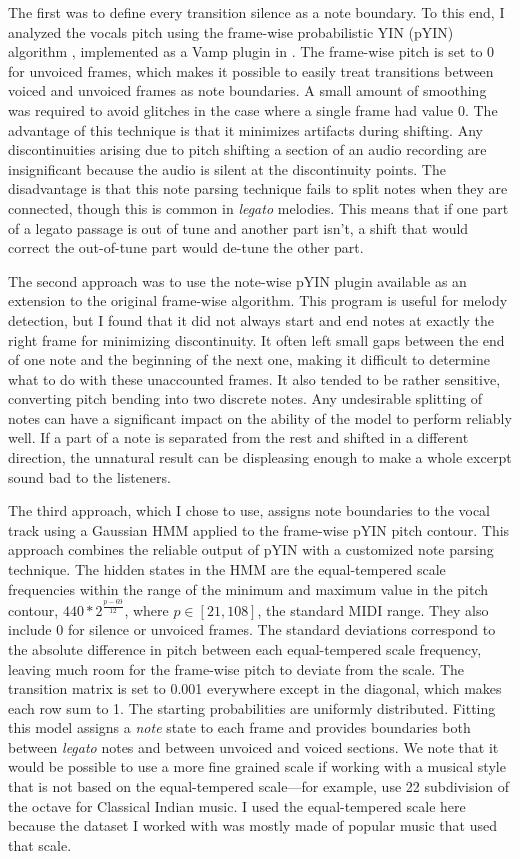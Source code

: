 The first was to define every transition silence as a note boundary. To this end, I analyzed the vocals pitch using the frame-wise probabilistic YIN (pYIN) algorithm \cite{mauch2014pyin}, implemented as a Vamp plugin in \cite{cannam2010sonic}. The frame-wise pitch is set to 0 for unvoiced frames, which makes it possible to easily treat transitions between voiced and unvoiced frames as note boundaries. A small amount of smoothing was required to avoid glitches in the case where a single frame had value 0. The advantage of this technique is that it minimizes artifacts during shifting. Any discontinuities arising due to pitch shifting a section of an audio recording are insignificant because the audio is silent at the discontinuity points. The disadvantage is that this note parsing technique fails to split notes when they are connected, though this is common in \textit{legato} melodies. This means that if one part of a legato passage is out of tune and another part isn't, a shift that would correct the out-of-tune part would de-tune the other part.

The second approach was to use the note-wise pYIN plugin available as an extension to the original frame-wise algorithm. This program is useful for melody detection, but I found that it did not always start and end notes at exactly the right frame for minimizing discontinuity. It often left small gaps between the end of one note and the beginning of the next one, making it difficult to determine what to do with these unaccounted frames. It also tended to be rather sensitive, converting pitch bending into two discrete notes. Any undesirable splitting of notes can have a significant impact on the ability of the model to perform reliably well. If a part of a note is separated from the rest and shifted in a different direction, the unnatural result can be displeasing enough to make a whole excerpt sound bad to the listeners.

The third approach, which I chose to use, assigns note boundaries to the vocal track using a Gaussian HMM applied to the frame-wise pYIN pitch contour. This approach combines the reliable output of pYIN with a customized note parsing technique. The hidden states in the HMM are the equal-tempered scale frequencies within the range of the minimum and maximum value in the pitch contour, $440 * 2^{\frac{p - 69}{12}}$, where $p \in [21, 108]$, the standard MIDI range. They also include 0 for silence or unvoiced frames. The standard deviations correspond to the absolute difference in pitch between each equal-tempered scale frequency, leaving much room for the frame-wise pitch to deviate from the scale. The transition matrix is set to 0.001 everywhere except in the diagonal, which makes each row sum to 1. The starting probabilities are uniformly distributed. Fitting this model assigns a \textit{note} state to each frame and provides boundaries both between \textit{legato} notes and between unvoiced and voiced sections. We note that it would be possible to use a more fine grained scale if working with a musical style that is not based on the equal-tempered scale---for example, use 22 subdivision of the octave for Classical Indian music. I used the equal-tempered scale here because the dataset I worked with was mostly made of popular music that used that scale.  

